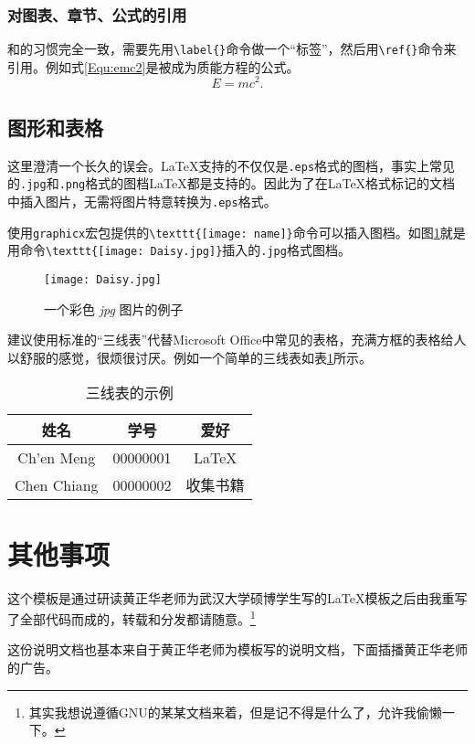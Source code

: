 \subsection{对图表、章节、公式的引用}
和\LaTeXe{}的习惯完全一致，需要先用\verb|\label{}|命令做一个“标签”，然后用\verb|\ref{}|命令来引用。例如式\ref{Equ:emc2}是被成为质能方程的公式。
\begin{equation}
E = m c^2.
\label{Equ:emc2}
\end{equation}
\section{图形和表格}
这里澄清一个长久的误会。\LaTeX{}支持的不仅仅是\texttt{.eps}格式的图档，事实上常见的\texttt{.jpg}和\texttt{.png}格式的图档\LaTeX{}都是支持的。因此为了在\LaTeX{}格式标记的文档中插入图片，无需将图片特意转换为\texttt{.eps}格式。

使用\texttt{graphicx}宏包提供的\verb|\texttt{[image: name]}|命令可以插入图档。如图\ref{Fig:jpg}就是用命令\verb|\texttt{[image: Daisy.jpg]}|插入的\texttt{.jpg}格式图档。
\begin{figure}
[htbp]
\centering
\texttt{[image: Daisy.jpg]}
\caption{一个彩色 \emph{jpg} 图片的例子}\label{Fig:jpg}
\end{figure}

建议使用标准的“三线表”代替Microsoft Office中常见的表格，充满方框的表格给人以舒服的感觉，很烦很讨厌。例如一个简单的三线表如表\ref{Tab:3lines}所示。
\begin{table}
[htbp]
\centering
\begin{tabular}
{ccc}
\toprule
姓名& 学号& 爱好\\
\hline
Ch'en Meng& 00000001& \LaTeX{}\\
Chen Chiang& 00000002& 收集书籍\\
\bottomrule
\end{tabular}
\caption{三线表的示例}\label{Tab:3lines}
\end{table}
\chapter{其他事项}
这个模板是通过研读黄正华老师为武汉大学硕博学生写的\LaTeX{}模板之后由我重写了全部代码而成的，转载和分发都请随意。\footnote{其实我想说遵循GNU的某某文档来着，但是记不得是什么了，允许我偷懒一下。}

这份说明文档也基本来自于黄正华老师为模板写的说明文档，下面插播黄正华老师的广告。

